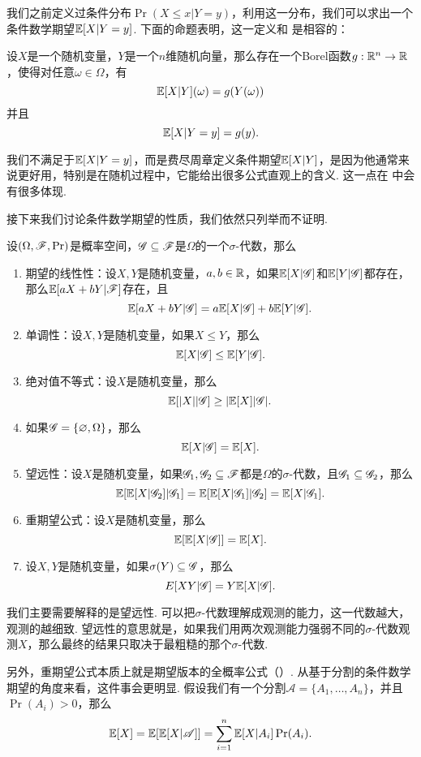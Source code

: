 我们之前定义过条件分布$\Pr(X\leq x|Y=y)$，利用这一分布，我们可以求出一个条件数学期望$\mathbb{E}[X|Y=y]$. 下面的命题表明，这一定义和 是相容的：

\begin{proposition}\label{prop:conditional-expectation-vector}
    设$X$是一个随机变量，$Y$是一个$n$维随机向量，那么存在一个Borel函数$g:\mathbb{R}^n\to\mathbb{R}$，使得对任意$\omega\in\Omega$，有
    \[\mathbb{E}[X|Y](\omega)=g(Y(\omega))\]
    并且
    \[\mathbb{E}[X|Y=y]=g(y).\]
\end{proposition}

我们不满足于$\mathbb{E}[X|Y=y]$，而是费尽周章定义条件期望$\mathbb{E}[X|Y]$，是因为他通常来说更好用，特别是在随机过程中，它能给出很多公式直观上的含义. 这一点在 中会有很多体现. 

接下来我们讨论条件数学期望的性质，我们依然只列举而不证明. 

\begin{proposition}\label{prop:conditional-expectation-basic}
设$(\Omega,\mathscr{F},\Pr)$是概率空间，$\mathscr{G}\subseteq\mathscr{F}$是$\Omega$的一个$\sigma$-代数，那么
\begin{enumerate}
\item 期望的线性性：设$X,Y$是随机变量，$a,b\in\mathbb{R}$，如果$\mathbb{E}[X|\mathscr{G}]$和$\mathbb{E}[Y|\mathscr{G}]$都存在，那么$\mathbb{E}[aX+bY|\mathscr{F}]$存在，且
\[\mathbb{E}[aX+bY|\mathscr{G}]=a\mathbb{E}[X|\mathscr{G}]+b\mathbb{E}[Y|\mathscr{G}].\]
\item 单调性：设$X,Y$是随机变量，如果$X\leq Y$，那么
\[\mathbb{E}[X|\mathscr{G}]\leq \mathbb{E}[Y|\mathscr{G}].\]
\item 绝对值不等式：设$X$是随机变量，那么
\[\mathbb{E}[|X||\mathscr{G}]\geq |\mathbb{E}[X]|\mathscr{G}|.\]
\item 如果$\mathscr{G}=\{\varnothing,\Omega\}$，那么
\[\mathbb{E}[X|\mathscr{G}]=\mathbb{E}[X].\]
\item 望远性：设$X$是随机变量，如果$\mathscr{G}_1,\mathscr{G}_2\subseteq\mathscr{F}$都是$\Omega$的$\sigma$-代数，且$\mathscr{G}_1\subseteq\mathscr{G}_2$，那么
\[\mathbb{E}[\mathbb{E}[X|\mathscr{G}_2]|\mathscr{G}_1]=\mathbb{E}[\mathbb{E}[X|\mathscr{G}_1]|\mathscr{G}_2]=\mathbb{E}[X|\mathscr{G}_1].\]
\item 重期望公式：设$X$是随机变量，那么
\[\mathbb{E}[\mathbb{E}[X|\mathscr{G}]]=\mathbb{E}[X].\]
\item 设$X,Y$是随机变量，如果$\sigma(Y)\subseteq\mathscr{G}$，那么
\[E[XY|\mathscr{G}]=Y\mathbb{E}[X|\mathscr{G}].\]
\end{enumerate}
\end{proposition}

我们主要需要解释的是望远性. 可以把$\sigma$-代数理解成观测的能力，这一代数越大，观测的越细致. 望远性的意思就是，如果我们用两次观测能力强弱不同的$\sigma$-代数观测$X$，那么最终的结果只取决于最粗糙的那个$\sigma$-代数. 

另外，重期望公式本质上就是期望版本的全概率公式（）. 从基于分割的条件数学期望的角度来看，这件事会更明显. 假设我们有一个分割$\mathscr{A}=\{A_1,\dots,A_n\}$，并且$\Pr(A_i)>0$，那么
\[\mathbb{E}[X]=\mathbb{E}[\mathbb{E}[X|\mathscr{A}]]=\sum_{i=1}^n \mathbb{E}[X|A_i]\Pr(A_i).\]


